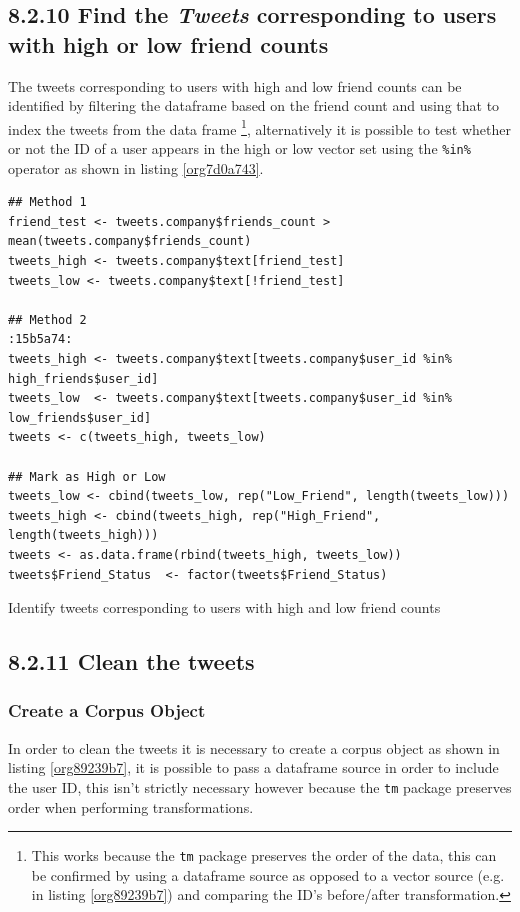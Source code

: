 \documentclass[11pt]{article}
\begin{document}
\subsection{8.2.10 Find the \emph{Tweets} corresponding to users with high or low friend counts}
\label{sec:org3e11298}
The tweets corresponding to users with high and low friend counts can be
identified by filtering the dataframe based on the friend count and using that
to index the tweets from the data frame \footnote{This works because the \texttt{tm} package preserves the order of the data, this can be confirmed by using a dataframe source as opposed to a vector source (e.g. in listing \ref{org89239b7}) and comparing the ID's before/after transformation.}, alternatively it is possible
to test whether or not the ID of a user appears in the high or low vector
set using the \texttt{\%in\%} operator as shown in listing \ref{org7d0a743}.

\begin{listing}[htbp]
\begin{verbatim}
## Method 1
friend_test <- tweets.company$friends_count > mean(tweets.company$friends_count)
tweets_high <- tweets.company$text[friend_test]
tweets_low <- tweets.company$text[!friend_test]

## Method 2                                                                 :15b5a74:
tweets_high <- tweets.company$text[tweets.company$user_id %in%  high_friends$user_id]
tweets_low  <- tweets.company$text[tweets.company$user_id %in%  low_friends$user_id]
tweets <- c(tweets_high, tweets_low)

## Mark as High or Low
tweets_low <- cbind(tweets_low, rep("Low_Friend", length(tweets_low)))
tweets_high <- cbind(tweets_high, rep("High_Friend", length(tweets_high)))
tweets <- as.data.frame(rbind(tweets_high, tweets_low))
tweets$Friend_Status  <- factor(tweets$Friend_Status)
\end{verbatim}
\caption{\label{org7d0a743}Identify tweets corresponding to users with high and low friend counts}
\end{listing}

\subsection{8.2.11 Clean the tweets}
\label{sec:org60caa52}
\subsubsection{Create a Corpus Object}
\label{sec:orga5e0d71}
In order to clean the tweets it is necessary to create a corpus object as shown in listing \ref{org89239b7}, it is possible to pass a dataframe source in order to include the user ID, this isn't strictly necessary however because the \texttt{tm} package preserves order when performing transformations.
\end{document}
